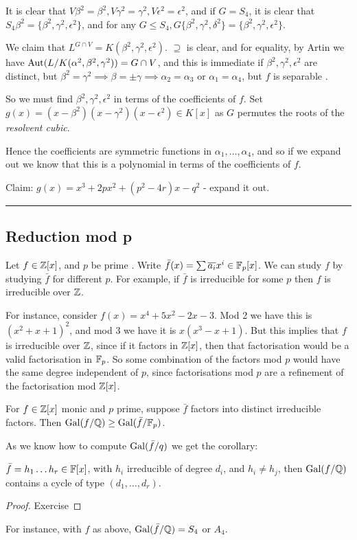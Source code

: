 \documentclass[10pt,a4paper]{article}
\begin{document}
It is clear that $V\beta^2 = \beta^2, V\gamma^2=\gamma^2, V \epsilon^2 = \epsilon^2$, and if $G = S_4$, it is clear that $S_4 \beta^2 = \{\beta^2, \gamma^2, \epsilon^2\}$, and for any $G \leq S_4, G \{\beta^2, \gamma^2, \delta^2\} = \{\beta^2, \gamma^2, \epsilon^2\}$.

We claim that $L^{G \cap V} = K(\beta^2, \gamma^2, \epsilon^2)$. $\supseteq$ is clear, and for equality, by Artin we have $\operatorname{Aut}(L/K(\alpha^2, \beta^2, \gamma^2)) = G \cap V$, and this is immediate if $\beta^2, \gamma^2, \epsilon^2$ are distinct, but $\beta^2 = \gamma^2 \implies \beta =\pm \gamma \implies \alpha_2=\alpha_3$ or $\alpha_1=\alpha_4$, but $f$ is separable \contr.

So we must find $\beta^2, \gamma^2, \epsilon^2$ in terms of the coefficients of $f$. Set $g(x) = (x-\beta^2)(x-\gamma^2)(x-\epsilon^2) \in K[x]$ as $G$ permutes the roots of the \emph{resolvent cubic}.

Hence the coefficients are symmetric functions in $\alpha_1, \ldots, \alpha_4$, and so if we expand out we know that this is a polynomial in terms of the coefficients of $f$.

Claim: $g(x) = x^3 + 2px^2 + (p^2-4r)x - q^2$ - expand it out. 
\hrule

\subsection*{Reduction mod p}
Let $f \in \mathbb{Z}[x]$, and $p$ be prime . Write $\bar{f}(x) = \sum \overline{a_i} x^i \in \mathbb{F}_p[x]$. We can study $f$ by studying $\bar{f}$ for different $p$. For example, if $\bar{f}$ is irreducible for some $p$ then $f$ is irreducible over $\mathbb{Z}$.

For instance, consider $f(x) = x^4+5x^2-2x-3$. Mod 2 we have this is $(x^2+x+1)^2$, and mod 3 we have it is $x(x^3-x+1)$. But this implies that $f$ is irreducible over $\mathbb{Z}$, since if it factors in $\mathbb{Z}[x]$, then that factorisation would be a valid factorisation in $\mathbb{F}_p$. So some combination of the factors mod $p$ would have the same degree independent of $p$, since factorisations mod $p$ are a refinement of the factorisation mod $\mathbb{Z}[x]$.

\begin{theorem}[Dedekind]
For $f \in \mathbb{Z}[x]$ monic and $p$ prime, suppose $\bar{f}$ factors into distinct irreducible factors. Then $\operatorname{Gal}(f/\mathbb{Q}) \geq \operatorname{Gal}(\bar{f}/\mathbb{F}_p)$.
\end{theorem}
As we know how to compute $\operatorname{Gal}(\bar{f}/q)$ we get the corollary:
\begin{corollary}
$\bar{f} = h_1\ldots h_r \in \mathbb{F}[x]$, with $h_i$ irreducible of degree $d_i$, and $h_i \neq h_j$, then $\operatorname{Gal}(f/\mathbb{Q})$ contains a cycle of type $(d_1, \ldots, d_r)$.
\end{corollary}
\begin{proof}
Exercise
\end{proof}
For instance, with $f$ as above, $\operatorname{Gal}(\bar{f}/\mathbb{Q}) = S_4$ or $A_4$.
\end{document}
